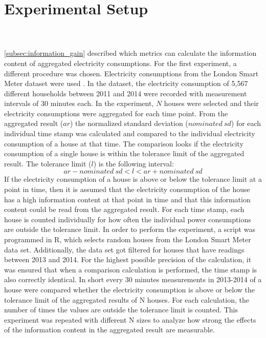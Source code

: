 \section{Experimental Setup}
\\
\\
\ref{subsec:information_gain} described which metrics can calculate the information content of aggregated electricity consumptions. For the first experiment, a different procedure was chosen. Electricity consumptions from the London Smart Meter dataset were used \cite{London}. In the dataset, the electricity consumption of 5,567 different households between 2011 and 2014 were recorded with measurement intervals of 30 minutes each. In the experiment, $N$ houses were selected and their electricity consumptions were aggregated for each time point. From the aggregated result ($ar$) the normalized standard deviation ($nominated\:sd$) for each individual time stamp was calculated and compared to the individual electricity consumption of a house at that time. The comparison looks if the electricity consumption of a single house is within the tolerance limit of the aggregated result. The tolerance limit ($l$) is the following interval:
\begin{equation}
\label{eq:tolerance}
ar - nominated\:sd< l < ar + nominated\:sd
\end{equation}
If the electricity consumption of a house is above or below the tolerance limit at a point in time, then it is assumed that the electricity consumption of the house has a high information content at that point in time and that this information content could be read from the aggregated result. For each time stamp, each house is counted individually for how often the individual power consumptions are outside the tolerance limit. In order to perform the experiment, a script was programmed in R, which selects random houses from the London Smart Meter data set. Additionally, the data set got filtered for houses that have readings between 2013 and 2014. For the highest possible precision of the calculation, it was ensured that when a comparison calculation is performed, the time stamp is also correctly identical. In short every 30 minutes measurements in 2013-2014 of a house were compared whether the electricity consumption is above or below the tolerance limit of the aggregated results of N houses. For each calculation, the number of times the values are outside the tolerance limit is counted. This experiment was repeated with different N sizes to analyze how strong the effects of the information content in the aggregated result are measurable.\\
